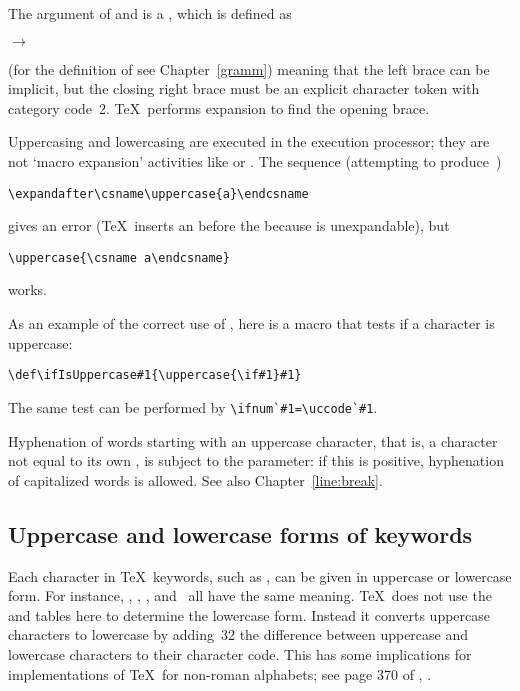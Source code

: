 The argument of  and 
is a , which is defined as
\begin{Disp}  $\longrightarrow$ \lb
      \end{Disp}
(for the definition of  see Chapter~\ref{gramm})
meaning that the left brace can be implicit, but the closing
right brace must be an explicit character token with category
code~2. \TeX\ performs expansion to find the opening
brace.

Uppercasing and lowercasing are executed in the execution processor;
they are not `macro expansion' activities
like  or .
The sequence (attempting to produce~)
\begin{verbatim}
\expandafter\csname\uppercase{a}\endcsname
\end{verbatim}
gives an error (\TeX\ inserts an  before   the
 because  is unexpandable), but
\begin{verbatim}
\uppercase{\csname a\endcsname}
\end{verbatim}
works.

As an example of the correct use of , here
is a macro that tests if a character is uppercase:
\begin{verbatim}
\def\ifIsUppercase#1{\uppercase{\if#1}#1}
\end{verbatim}
The same test can be
performed by \verb>\ifnum`#1=\uccode`#1>.

Hyphenation of words starting with an uppercase character,
that is, a character not equal to its own ,
is subject to the  parameter: if this
is positive, hyphenation of capitalized words is allowed.
See also Chapter~\ref{line:break}.

\subsection{Uppercase and lowercase forms of keywords}

Each character in \TeX\ keywords, such as , can be
given in uppercase or lowercase form. 
For instance, , , , and~ all have
the same meaning. \TeX\ does not use
the  and  tables here to
determine the lowercase form. Instead it
converts uppercase characters to lowercase by adding~32
\ldash the \ascii{} difference between uppercase and lowercase
characters \rdash to their character code. This has some implications
for implementations of \TeX\ for non-roman alphabets;
see page 370 of \TeXbook, \cite{Knuth:TeXbook}.

